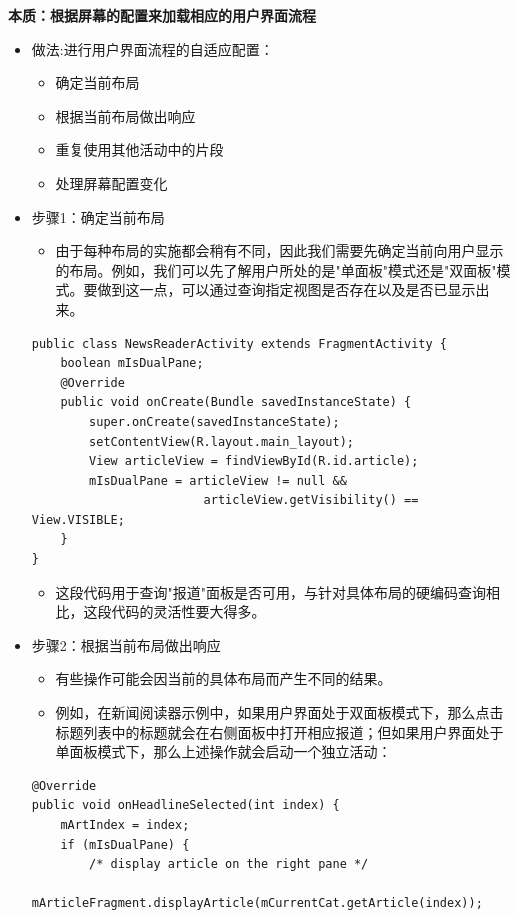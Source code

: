 \documentclass[9pt, b5paper]{article}
\begin{document}
\begin{enumerate}
\textbf{本质：根据屏幕的配置来加载相应的用户界面流程}
\begin{itemize}
\item 做法:进行用户界面流程的自适应配置：
\begin{itemize}
\item 确定当前布局
\item 根据当前布局做出响应
\item 重复使用其他活动中的片段
\item 处理屏幕配置变化
\end{itemize}
\item 步骤1：确定当前布局
\begin{itemize}
\item 由于每种布局的实施都会稍有不同，因此我们需要先确定当前向用户显示的布局。例如，我们可以先了解用户所处的是"单面板"模式还是"双面板"模式。要做到这一点，可以通过查询指定视图是否存在以及是否已显示出来。
\end{itemize}
\begin{verbatim}
public class NewsReaderActivity extends FragmentActivity {
    boolean mIsDualPane;
    @Override
    public void onCreate(Bundle savedInstanceState) {
        super.onCreate(savedInstanceState);
        setContentView(R.layout.main_layout);
        View articleView = findViewById(R.id.article);
        mIsDualPane = articleView != null &&
                        articleView.getVisibility() == View.VISIBLE;
    }
}
\end{verbatim}
\begin{itemize}
\item 这段代码用于查询"报道"面板是否可用，与针对具体布局的硬编码查询相比，这段代码的灵活性要大得多。
\end{itemize}
\item 步骤2：根据当前布局做出响应
\begin{itemize}
\item 有些操作可能会因当前的具体布局而产生不同的结果。
\item 例如，在新闻阅读器示例中，如果用户界面处于双面板模式下，那么点击标题列表中的标题就会在右侧面板中打开相应报道；但如果用户界面处于单面板模式下，那么上述操作就会启动一个独立活动：
\end{itemize}
\begin{verbatim}
@Override
public void onHeadlineSelected(int index) {
    mArtIndex = index;
    if (mIsDualPane) {
        /* display article on the right pane */
        mArticleFragment.displayArticle(mCurrentCat.getArticle(index));

\end{verbatim}
\end{itemize}
\end{enumerate}
\end{document}
